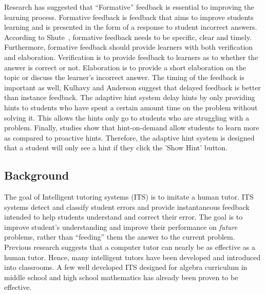 \documentclass{sigchi}
\begin{document}
Research has suggested that ``Formative'' feedback is essential to
improving the learning
process\cite{Azevedo1995}\cite{Bangert-Drowns1991}. Formative feedback
is feedback that aims to improve students learning and is presented in
the form of a response to student incorrect
answers\cite{Shute2008}. According to Shute~\cite{Shute2008},
formative feedback needs to be specific, clear and
timely. Furthermore, formative feedback should provide learners with
both verification and
elaboration\cite{Mason2001}\cite{Bangert-Drowns1991}. Verification is
to provide feedback to learners as to whether the answer is correct or
not. Elaboration is to provide a short elaboration on the topic or
discuss the learner's incorrect answer. The timing of the feedback is
important as well, Kulhavy and Anderson suggest that delayed feedback
is better than instance feedback\cite{Kulhavy1972}. The adaptive hint
system delay hints by only providing hints to students who have spent
a certain amount time on the problem without solving it. This allows
the hints only go to students who are struggling with a
problem. Finally, studies show that hint-on-demand allow students to
learn more as compared to proactive hints\cite{Razzaq2010}. Therefore,
the adaptive hint system is designed that a student will only see a
hint if they click the 'Show Hint' button.



\subsection*{Background}
The goal of Intelligent tutoring systems (ITS)\cite{Anderson1995} is to imitate a human tutor.  ITS systems detect and classify student errors and provide instantaneous feedback intended to help students
understand and correct their error. The goal is to improve
student's understanding and improve their performance on {\em future} problems, rather than ``feeding'' them the answer to the current problem.  Previous research suggests that a computer tutor can nearly be as effective as a human tutor\cite{Vanlehn2011}. Hence, many intelligent tutors have been developed and introduced into classrooms. A few well developed ITS designed for algebra curriculum in middle school and high school mathematics has already been proven
to be effective\cite{Koedinger1997, John2014}.
\end{document}
